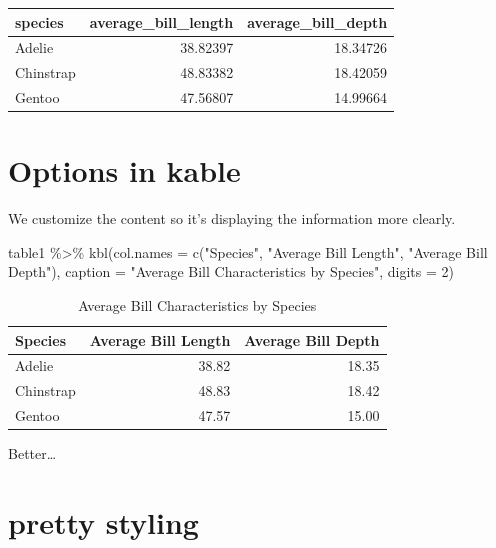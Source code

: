 \documentclass[
  letterpaper,
  DIV=11,
  numbers=noendperiod]{scrartcl}
\newenvironment{Shaded}{\begin{snugshade}}{\end{snugshade}}
\newcommand{\AttributeTok}[1]{\textcolor[rgb]{0.40,0.45,0.13}{#1}}
\newcommand{\DecValTok}[1]{\textcolor[rgb]{0.68,0.00,0.00}{#1}}
\newcommand{\FunctionTok}[1]{\textcolor[rgb]{0.28,0.35,0.67}{#1}}
\newcommand{\NormalTok}[1]{\textcolor[rgb]{0.00,0.23,0.31}{#1}}
\newcommand{\SpecialCharTok}[1]{\textcolor[rgb]{0.37,0.37,0.37}{#1}}
\newcommand{\StringTok}[1]{\textcolor[rgb]{0.13,0.47,0.30}{#1}}
\begin{document}
\begin{tabular}[t]{l|r|r}
\hline
species & average\_bill\_length & average\_bill\_depth\\
\hline
Adelie & 38.82397 & 18.34726\\
\hline
Chinstrap & 48.83382 & 18.42059\\
\hline
Gentoo & 47.56807 & 14.99664\\
\hline
\end{tabular}

\hypertarget{options-in-kable}{%
\section{Options in kable}\label{options-in-kable}}

We customize the content so it's displaying the information more
clearly.

\begin{Shaded}
\begin{Highlighting}[]
\NormalTok{table1 }\SpecialCharTok{\%\textgreater{}\%}
  \FunctionTok{kbl}\NormalTok{(}\AttributeTok{col.names =} \FunctionTok{c}\NormalTok{(}\StringTok{"Species"}\NormalTok{, }\StringTok{"Average Bill Length"}\NormalTok{, }\StringTok{"Average Bill Depth"}\NormalTok{), }
    \AttributeTok{caption =} \StringTok{"Average Bill Characteristics by Species"}\NormalTok{, }
    \AttributeTok{digits =} \DecValTok{2}\NormalTok{)}
\end{Highlighting}
\end{Shaded}

\begin{table}

\caption{Average Bill Characteristics by Species}
\centering
\begin{tabular}[t]{l|r|r}
\hline
Species & Average Bill Length & Average Bill Depth\\
\hline
Adelie & 38.82 & 18.35\\
\hline
Chinstrap & 48.83 & 18.42\\
\hline
Gentoo & 47.57 & 15.00\\
\hline
\end{tabular}
\end{table}

Better\ldots{}

\hypertarget{pretty-styling}{%
\section{pretty styling}\label{pretty-styling}}
\end{document}
